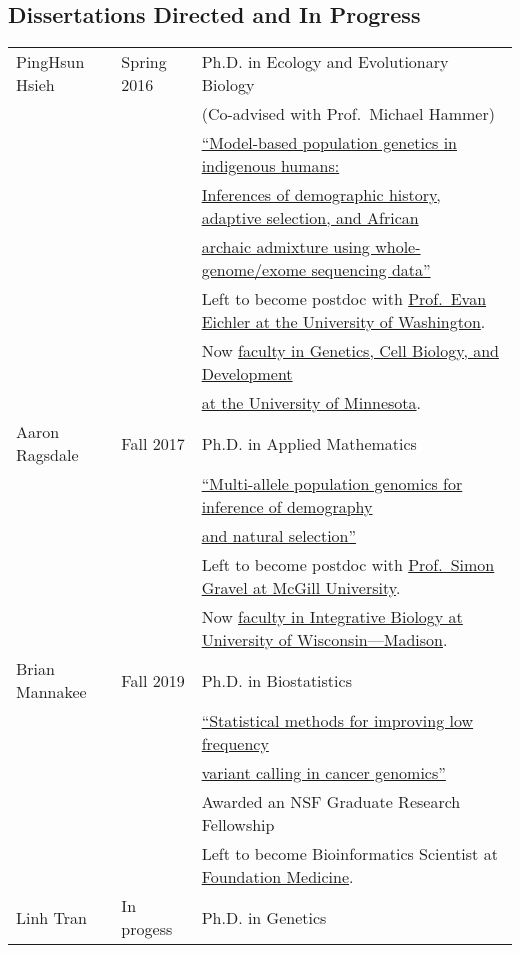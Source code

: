 \documentclass[11pt]{article}
\begin{document}
\subsection*{Dissertations Directed and In Progress}
\begin{longtable}[l]{l l l}
PingHsun Hsieh & Spring 2016 & Ph.D. in Ecology and Evolutionary Biology\\
 & & (Co-advised with Prof.\ Michael Hammer)\\
 & & \href{http://hdl.handle.net/10150/612540}{``Model-based population genetics in indigenous humans:}\\
 &&\href{http://hdl.handle.net/10150/612540}{Inferences of demographic history, adaptive selection, and African}\\
 &&\href{http://hdl.handle.net/10150/612540}{archaic admixture using whole-genome/exome sequencing data''}\\
 && Left to become postdoc with \href{https://eichlerlab.gs.washington.edu/}{Prof.\ Evan Eichler at the University of Washington}.\\
 && Now \href{https://hsiehph.github.io/}{faculty in Genetics, Cell Biology, and Development}\\
 && \href{https://hsiehph.github.io/}{at the University of Minnesota}.\\
Aaron Ragsdale & Fall 2017 & Ph.D. in Applied Mathematics\\
& & \href{http://hdl.handle.net/10150/622993}{``Multi-allele population genomics for inference of demography}\\
&&\href{http://hdl.handle.net/10150/622993}{and natural selection''}\\
&& Left to become postdoc with \href{http://simongravel.lab.mcgill.ca/}{Prof.\ Simon Gravel at McGill University}.\\
&&Now \href{https://apragsdale.github.io/}{faculty in Integrative Biology at University of Wisconsin—Madison}.\\
Brian Mannakee & Fall 2019 & Ph.D. in Biostatistics\\
& &\href{http://hdl.handle.net/10150/637708}{``Statistical methods for improving low frequency}\\
&&\href{http://hdl.handle.net/10150/637708}{variant calling in cancer genomics''}\\
&&Awarded an NSF Graduate Research Fellowship\\
&&Left to become Bioinformatics Scientist at \href{https://www.foundationmedicine.com}{Foundation Medicine}.\\ 
Linh Tran & In progess & Ph.D. in Genetics\\
 \end{longtable}
\end{document}
